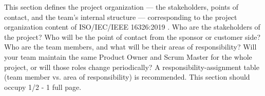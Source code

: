 This section defines the project organization --- the stakeholders, points of contact, and the team's internal structure --- corresponding to the project organization content of ISO/IEC/IEEE 16326:2019 \cite{ISO16326}. Who are the stakeholders of the project? Who will be the point of contact from the sponsor or customer side? Who are the team members, and what will be their areas of responsibility? Will your team maintain the same Product Owner and Scrum Master for the whole project, or will those roles change periodically? A responsibility-assignment table (team member vs. area of responsibility) is recommended. This section should occupy 1/2 - 1 full page.